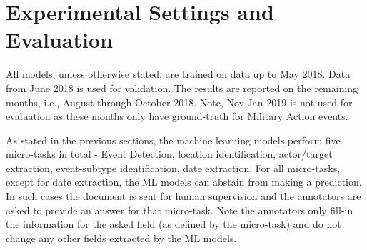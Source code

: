 \section{Experimental Settings and Evaluation}
All models, unless otherwise stated, are trained on data up to May 2018. Data from June 2018 is used for validation. The results are reported on the remaining months, i.e., August through October 2018. Note, Nov-Jan 2019 is not used for evaluation as these months only have ground-truth for Military Action events.

As stated in the previous sections, the machine learning models perform five micro-tasks in total - Event Detection, location identification, actor/target extraction, event-subtype identification, date extraction. For all micro-tasks, except for date extraction, the ML models can abstain from making a prediction. In such cases the document is sent for human supervision and the annotators are asked to provide an answer for that micro-task. Note the annotators only fill-in the information for the asked field (as defined by the micro-task) and do not change any other fields extracted by the ML models.

